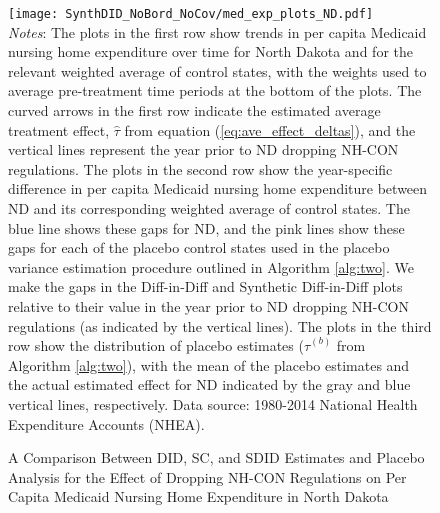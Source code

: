 \documentclass[../Main.tex]{subfiles}
\begin{document}
\newpage
{}
\begin{figure}[t] 
    \setlength{}
	\caption{\label{fig:med_exp_plots_pa} \centering A Comparison Between DID, SC, and SDID Estimates and Placebo Analysis for the Effect of Dropping NH-CON Regulations on Per Capita Medicaid Nursing Home Expenditure in North Dakota} {\centering\texttt{[image: SynthDID\_NoBord\_NoCov/med\_exp\_plots\_ND.pdf]}}
    \vspace{-1.4cm}\\
    \scriptsize
		\textit{Notes}: The plots in the first row show trends in per capita Medicaid nursing home expenditure over time for North Dakota and for the relevant weighted average of control states, with the weights used to average pre-treatment time periods at the bottom of the plots. The curved arrows in the first row indicate the estimated average treatment effect, $\hat{\tau}$ from equation (\ref{eq:ave_effect_deltas}), and the vertical lines represent the year prior to ND dropping NH-CON regulations. The plots in the second row show the year-specific difference in per capita Medicaid nursing home expenditure between ND and its corresponding weighted average of control states. The blue line shows these gaps for ND, and the pink lines show these gaps for each of the placebo control states used in the placebo variance estimation procedure outlined in Algorithm \ref{alg:two}. We make the gaps in the Diff-in-Diff and Synthetic Diff-in-Diff plots relative to their value in the year prior to ND dropping NH-CON regulations (as indicated by the vertical lines). The plots in the third row show the distribution of placebo estimates ($\hat{\tau}^{(b)}$ from Algorithm \ref{alg:two}), with the mean of the placebo estimates and the actual estimated effect for ND indicated by the gray and blue vertical lines, respectively. Data source: 1980-2014 National Health Expenditure Accounts (NHEA).
\end{figure}
\restoregeometry
\clearpage
\end{document}
